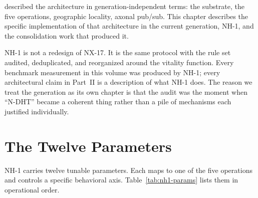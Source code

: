 \documentclass[twoside,nobib]{tufte-book}
\newcommand{\NDHT}{N-DHT\xspace}
\begin{document}
 described the architecture in
generation-independent terms: the substrate, the five operations,
geographic locality, axonal pub/sub. This chapter describes the
specific implementation of that architecture in the current
generation, NH-1, and the consolidation work that produced it.

NH-1 is not a redesign of NX-17. It is the same protocol with
the rule set audited, deduplicated, and reorganized around the
vitality function. Every benchmark measurement in this volume
was produced by NH-1; every architectural claim in Part~II is a
description of what NH-1 does. The reason we treat the
generation as its own chapter is that the audit was the moment
when ``\NDHT'' became a coherent thing rather than a pile of
mechanisms each justified individually.

\section{The Twelve Parameters}
\label{sec:nh1-params}

NH-1 carries twelve tunable parameters. Each maps to one of the
five operations and controls a specific behavioral axis.
Table~\ref{tab:nh1-params} lists them in operational order.
\end{document}

